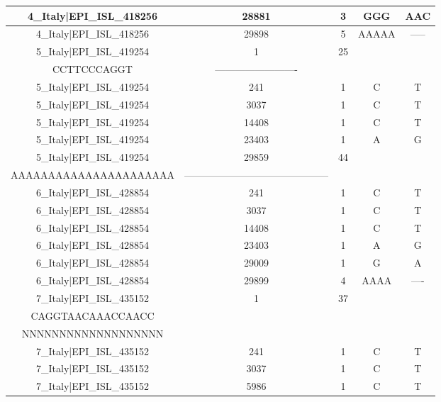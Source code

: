 \documentclass[a4paper,10pt]{article}
\begin{document}
\begin{longtable}{@{}ccccc@{}}
4\_Italy|EPI\_ISL\_418256 & 28881 & 3 & GGG & AAC \\* \midrule
4\_Italy|EPI\_ISL\_418256 & 29898 & 5 & AAAAA & ----- \\* \midrule
5\_Italy|EPI\_ISL\_419254 & 1 & 25 & \begin{tabular}[c]{@{}c@{}}ATTAAAGGTTTATA\\ CCTTCCCAGGT\end{tabular} & ------------------------- \\* \midrule
5\_Italy|EPI\_ISL\_419254 & 241 & 1 & C & T \\* \midrule
5\_Italy|EPI\_ISL\_419254 & 3037 & 1 & C & T \\* \midrule
5\_Italy|EPI\_ISL\_419254 & 14408 & 1 & C & T \\* \midrule
5\_Italy|EPI\_ISL\_419254 & 23403 & 1 & A & G \\* \midrule
5\_Italy|EPI\_ISL\_419254 & 29859 & 44 & \begin{tabular}[c]{@{}c@{}}AGGAGAATGACAAAAAAAAAAA\\ AAAAAAAAAAAAAAAAAAAAAA\end{tabular} & -------------------------------------------- \\* \midrule
6\_Italy|EPI\_ISL\_428854 & 241 & 1 & C & T \\* \midrule
6\_Italy|EPI\_ISL\_428854 & 3037 & 1 & C & T \\* \midrule
6\_Italy|EPI\_ISL\_428854 & 14408 & 1 & C & T \\* \midrule
6\_Italy|EPI\_ISL\_428854 & 23403 & 1 & A & G \\* \midrule
6\_Italy|EPI\_ISL\_428854 & 29009 & 1 & G & A \\* \midrule
6\_Italy|EPI\_ISL\_428854 & 29899 & 4 & AAAA & ---- \\* \midrule
7\_Italy|EPI\_ISL\_435152 & 1 & 37 & \begin{tabular}[c]{@{}c@{}}ATTAAAGGTTTATACCTTCC\\ CAGGTAACAAACCAACC\end{tabular} & \begin{tabular}[c]{@{}c@{}}NNNNNNNNNNNNNNNNNN\\ NNNNNNNNNNNNNNNNNNN\end{tabular} \\* \midrule
7\_Italy|EPI\_ISL\_435152 & 241 & 1 & C & T \\* \midrule
7\_Italy|EPI\_ISL\_435152 & 3037 & 1 & C & T \\* \midrule
7\_Italy|EPI\_ISL\_435152 & 5986 & 1 & C & T \\* \midrule

\end{longtable}
\end{document}
